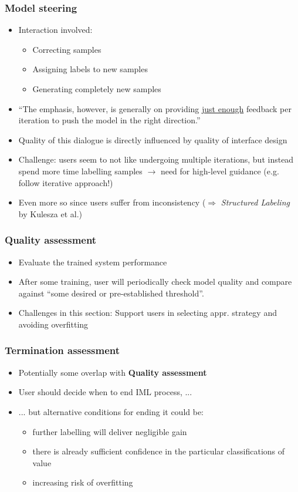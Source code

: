 \documentclass[12pt,a4paper]{article}
\begin{document}
\subsubsection{Model steering}
\begin{itemize}
\item Interaction involved:
\begin{itemize}
\item Correcting samples
\item Assigning labels to new samples
\item Generating completely new samples
\end{itemize}
\item ``The emphasis, however, is generally on providing \underline{just enough} feedback per iteration to push the model in the right direction.''
\item Quality of this dialogue is directly influenced by quality of interface design
\item Challenge: users seem to not like undergoing multiple iterations, but instead spend more time labelling samples $\rightarrow$ need for high-level guidance (e.g. follow iterative approach!)
\item Even more so since users suffer from inconsistency ($\Rightarrow$ \textit{Structured Labeling} by Kulesza et al.)
\end{itemize}
\subsubsection{Quality assessment}
\begin{itemize}
\item Evaluate the trained system performance
\item After some training, user will periodically check model quality and compare against ``some desired or pre-established threshold''.
\item Challenges in this section: Support users in selecting appr. strategy and avoiding overfitting
\end{itemize}
\subsubsection{Termination assessment}
\begin{itemize}
\item Potentially some overlap with \textbf{Quality assessment}
\item User should decide when to end IML process, ...
\item ... but alternative conditions for ending it could be:
\begin{itemize}
\item further labelling will deliver negligible gain
\item there is already sufficient confidence in the particular classifications of value
\item increasing risk of overfitting
\end{itemize}
\end{itemize}
\end{document}
